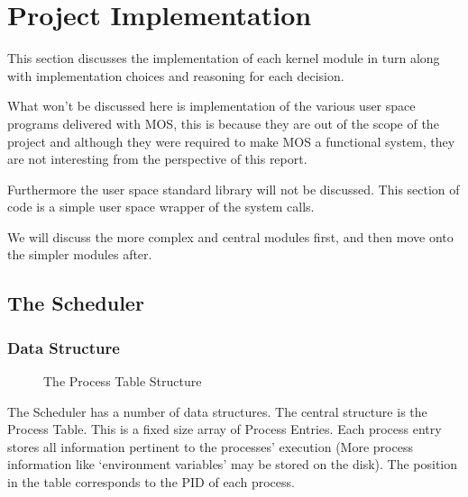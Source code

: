 \documentclass[a4paper]{report}
\begin{document}
\chapter{Project Implementation}

This section discusses the implementation of each kernel module in turn along with implementation choices and reasoning for each decision.

What won't be discussed here is implementation of the various user space programs delivered with MOS, this is because they are out of the scope of the project and although they were required to make MOS a functional system, they are not interesting from the perspective of this report.

Furthermore the user space standard library will not be discussed. This section of code is a simple user space wrapper of the system calls.

We will discuss the more complex and central modules first, and then move onto the simpler modules after.
















\clearpage

\section{The Scheduler}


\subsection{Data Structure}

\begin{figure}[ht]
  \centering

  \def\svgwidth{\columnwidth}
  
  \caption{The Process Table Structure}
  \label{fig:schedulerscreen}
\end{figure}


The Scheduler has a number of data structures. The central structure is the Process Table. This is a fixed size array of Process Entries. Each process entry stores all information pertinent to the processes' execution (More process information like `environment variables' may be stored on the disk). The position in the table corresponds to the PID of each process.
\end{document}
